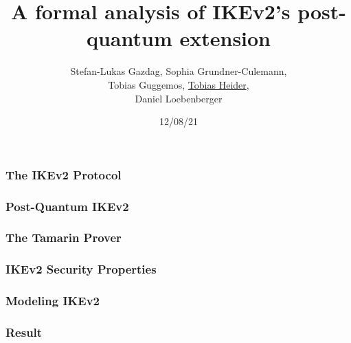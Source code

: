 \documentclass{beamer}
\title{A formal analysis of IKEv2's post-quantum extension}
\author{Stefan-Lukas Gazdag, Sophia Grundner-Culemann,\\
    Tobias Guggemos, \underline{Tobias Heider},\\
    Daniel Loebenberger}
\institute{ACSAC2021}
\date{12/08/21}
\begin{document}
\begin{frame}
	\titlepage
\end{frame}

\begin{frame}
\frametitle{The IKEv2 Protocol}
\end{frame}

\begin{frame}
\frametitle{Post-Quantum IKEv2}
\end{frame}

\begin{frame}
\frametitle{The Tamarin Prover}
\end{frame}

\begin{frame}
\frametitle{IKEv2 Security Properties}
\end{frame}

\begin{frame}
\frametitle{Modeling IKEv2}
\end{frame}

\begin{frame}
\frametitle{Result}
\end{frame}
\end{document}
